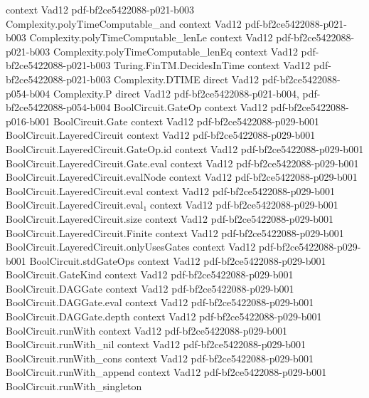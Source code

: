 \begin{theorem}
  {context}
  {Vad12}
  {pdf-bf2ce5422088-p021-b003}
\proofstep
  {Complexity.polyTimeComputable_and}
  {context}
  {Vad12}
  {pdf-bf2ce5422088-p021-b003}
\proofstep
  {Complexity.polyTimeComputable_lenLe}
  {context}
  {Vad12}
  {pdf-bf2ce5422088-p021-b003}
\proofstep
  {Complexity.polyTimeComputable_lenEq}
  {context}
  {Vad12}
  {pdf-bf2ce5422088-p021-b003}
\proofstep
  {Turing.FinTM.DecidesInTime}
  {context}
  {Vad12}
  {pdf-bf2ce5422088-p021-b003}
\proofstep
  {Complexity.DTIME}
  {direct}
  {Vad12}
  {pdf-bf2ce5422088-p054-b004}
\proofstep
  {Complexity.P}
  {direct}
  {Vad12}
  {pdf-bf2ce5422088-p021-b004,
    pdf-bf2ce5422088-p054-b004}
\proofstep
  {BoolCircuit.GateOp}
  {context}
  {Vad12}
  {pdf-bf2ce5422088-p016-b001}
\proofstep
  {BoolCircuit.Gate}
  {context}
  {Vad12}
  {pdf-bf2ce5422088-p029-b001}
\proofstep
  {BoolCircuit.LayeredCircuit}
  {context}
  {Vad12}
  {pdf-bf2ce5422088-p029-b001}
\proofstep
  {BoolCircuit.LayeredCircuit.GateOp.id}
  {context}
  {Vad12}
  {pdf-bf2ce5422088-p029-b001}
\proofstep
  {BoolCircuit.LayeredCircuit.Gate.eval}
  {context}
  {Vad12}
  {pdf-bf2ce5422088-p029-b001}
\proofstep
  {BoolCircuit.LayeredCircuit.evalNode}
  {context}
  {Vad12}
  {pdf-bf2ce5422088-p029-b001}
\proofstep
  {BoolCircuit.LayeredCircuit.eval}
  {context}
  {Vad12}
  {pdf-bf2ce5422088-p029-b001}
\proofstep
  {BoolCircuit.LayeredCircuit.eval₁}
  {context}
  {Vad12}
  {pdf-bf2ce5422088-p029-b001}
\proofstep
  {BoolCircuit.LayeredCircuit.size}
  {context}
  {Vad12}
  {pdf-bf2ce5422088-p029-b001}
\proofstep
  {BoolCircuit.LayeredCircuit.Finite}
  {context}
  {Vad12}
  {pdf-bf2ce5422088-p029-b001}
\proofstep
  {BoolCircuit.LayeredCircuit.onlyUsesGates}
  {context}
  {Vad12}
  {pdf-bf2ce5422088-p029-b001}
\proofstep
  {BoolCircuit.stdGateOps}
  {context}
  {Vad12}
  {pdf-bf2ce5422088-p029-b001}
\proofstep
  {BoolCircuit.GateKind}
  {context}
  {Vad12}
  {pdf-bf2ce5422088-p029-b001}
\proofstep
  {BoolCircuit.DAGGate}
  {context}
  {Vad12}
  {pdf-bf2ce5422088-p029-b001}
\proofstep
  {BoolCircuit.DAGGate.eval}
  {context}
  {Vad12}
  {pdf-bf2ce5422088-p029-b001}
\proofstep
  {BoolCircuit.DAGGate.depth}
  {context}
  {Vad12}
  {pdf-bf2ce5422088-p029-b001}
\proofstep
  {BoolCircuit.runWith}
  {context}
  {Vad12}
  {pdf-bf2ce5422088-p029-b001}
\proofstep
  {BoolCircuit.runWith_nil}
  {context}
  {Vad12}
  {pdf-bf2ce5422088-p029-b001}
\proofstep
  {BoolCircuit.runWith_cons}
  {context}
  {Vad12}
  {pdf-bf2ce5422088-p029-b001}
\proofstep
  {BoolCircuit.runWith_append}
  {context}
  {Vad12}
  {pdf-bf2ce5422088-p029-b001}
\proofstep
  {BoolCircuit.runWith_singleton}

\end{theorem}
